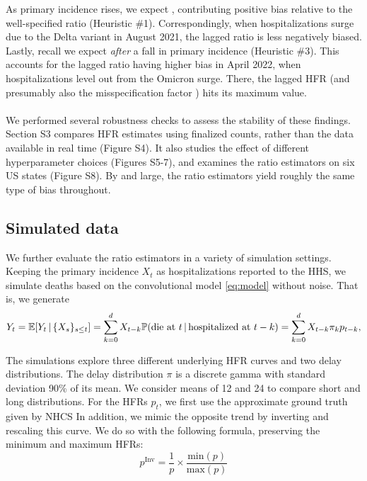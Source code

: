 \documentclass{article}
\newcommand{\given}{\, \vert \,}
\begin{document}
As primary incidence rises, we expect , contributing
positive bias relative to the well-specified
ratio (Heuristic \#1). Correspondingly, when hospitalizations surge due to the Delta variant in 
August 2021, the lagged ratio is less negatively biased. Lastly, recall we
expect  \emph{after} a fall in primary incidence (Heuristic \#3). This
accounts for the lagged ratio having higher bias in April 2022, when
hospitalizations level out from the Omicron surge. There, the lagged HFR (and 
presumably also the misspecification factor ) hits its maximum
value.   

\paragraph{}

We performed several robustness checks to assess the stability of these
findings. Section S3 compares HFR estimates using finalized counts, rather than the
data available in real time (Figure S4).
It also studies the effect of different
hyperparameter choices (Figures S5-7), and examines the ratio estimators on six US
states (Figure S8). By and large, the ratio estimators yield roughly
the same type of bias throughout.


\subsection{Simulated data}
\label{sec:results_sim}

We further evaluate the ratio estimators in a variety of simulation settings. 
Keeping the primary incidence $X_t$ as hospitalizations reported to the HHS, we simulate deaths based on the convolutional model \eqref{eq:model} without noise. That is, we generate
\[
Y_t = \E[Y_t\given \{X_s\}_{s\leq t}] = \sum_{k=0}^d X_{t-k} \P(\text{die at $t$} \given \text{hospitalized at
  $t-k$}) = \sum_{k=0}^d X_{t-k} \pi_k p_{t-k},
\]

The simulations explore three different underlying HFR curves and two delay distributions. The delay distribution $\pi$ is a discrete gamma with
standard deviation 90\% of its mean. We consider means of 12 and 24 to
compare short and long distributions.
For the HFRs $p_t$, we first use the approximate ground truth given by NHCS
In addition, we mimic the opposite trend by inverting and rescaling this curve. 
We do so with the following formula, preserving the minimum and maximum HFRs:
\[
p^\text{Inv} = \frac{1}{p}\times\frac{\text{min}(p)}{\text{max}(p)}
\]
\end{document}
